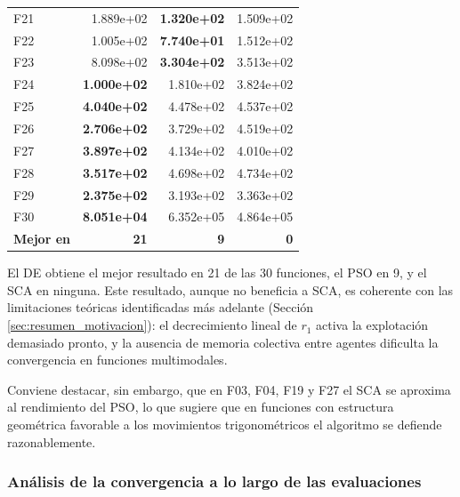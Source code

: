 \documentclass[12pt,a4paper]{article}
\begin{document}
\begin{longtable}{lrrr}
F21  & 1.889e+02 & \textbf{1.320e+02} & 1.509e+02 \\
F22  & 1.005e+02 & \textbf{7.740e+01} & 1.512e+02 \\
F23  & 8.098e+02 & \textbf{3.304e+02} & 3.513e+02 \\
F24  & \textbf{1.000e+02} & 1.810e+02 & 3.824e+02 \\
F25  & \textbf{4.040e+02} & 4.478e+02 & 4.537e+02 \\
F26  & \textbf{2.706e+02} & 3.729e+02 & 4.519e+02 \\
F27  & \textbf{3.897e+02} & 4.134e+02 & 4.010e+02 \\
F28  & \textbf{3.517e+02} & 4.698e+02 & 4.734e+02 \\
F29  & \textbf{2.375e+02} & 3.193e+02 & 3.363e+02 \\
F30  & \textbf{8.051e+04} & 6.352e+05 & 4.864e+05 \\
\midrule
\textbf{Mejor en} & \textbf{21} & \textbf{9} & \textbf{0} \\
\end{longtable}
 
El DE obtiene el mejor resultado en 21 de las 30 funciones, el PSO en 9, y el SCA en ninguna. Este resultado, aunque no beneficia a SCA, es coherente con las limitaciones teóricas identificadas más adelante (Sección \ref{sec:resumen_motivacion}): el decrecimiento lineal de $r_1$ activa la explotación demasiado pronto, y la ausencia de memoria colectiva entre agentes dificulta la convergencia en funciones multimodales.
 
Conviene destacar, sin embargo, que en F03, F04, F19 y F27 el SCA se aproxima al rendimiento del PSO, lo que sugiere que en funciones con estructura geométrica favorable a los movimientos trigonométricos el algoritmo se defiende razonablemente.
 
\subsubsection{Análisis de la convergencia a lo largo de las evaluaciones}
 
\end{document}
